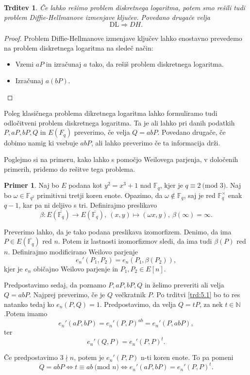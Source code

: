 \documentclass[12pt,a4paper,twoside]{article}
\theoremstyle{definition} %
\newtheorem{primer}[definicija]{Primer}
\theoremstyle{plain} %
\newtheorem{trditev}[definicija]{Trditev}
\numberwithin{equation}{section}  %
\newcommand{\N}{\mathbb N}
\newcommand{\F}{\mathbb F}
\newcommand{\E}[1]{E({#1})}
\newcommand{\MOD}[1]{\ \text{(mod }{#1}\text{)}}
\begin{document}
\begin{trditev}
Če lahko rešimo problem diskretnega logaritma, potem smo rešili tudi problem Diffie-Hellmanove izmenjave ključev. Povedano drugače velja
$$\text{DL} \Rightarrow DH.$$
\end{trditev}

\begin{proof}
Problem Diffie-Hellmanove izmenjave ključev lahko enostavno prevedemo na problem diskretnega logaritma na sledeč način:

\begin{itemize}
\item Vzemi $aP$ in izračunaj $a$ tako, da rešiš problem diskretnega logaritma.
\item Izračunaj $a(bP)$.
\end{itemize}

\end{proof}

Poleg klasičnega problema dikretnega logaritma lahko formuliramo tudi odločitveni problem diskretnega logaritma. Ta je ali lahko pri danih podatkih $P,aP,bP,Q$ in $\E{F_q}$ preverimo, če velja $Q = abP$.
Povedano drugače, če dobimo namig ki vsebuje $abP$, ali lahko preverimo če ta informacija drži.

Poglejmo si na primeru, kako lahko s pomočjo Weilovega parjenja, v določenih primerih, pridemo do rešitve tega problema.

\begin{primer}
Naj bo $E$ podana kot $y^2=x^3+1$ nad $\F_q$, kjer je $q \equiv 2 \MOD{3}$. Naj bo $\omega \in \F_{q^2}$ primitivni tretji koren enote. Opazimo, da $\omega \notin \F_q$, saj je red $\F^{\times}_q$ enak $q-1$, kar pa ni deljivo s tri.
Definirajmo preslikavo
$$\beta:\E{\overline{\F_q}} \rightarrow \E{\overline{\F_q}}, \ (x,y) \mapsto (\omega x,y), \ \beta(\infty) = \infty.$$

Preverimo lahko, da je tako podana preslikava izomorfizem. Denimo, da ima $P \in \E{\overline{\F_q}}$ red $n$. Potem iz lastnosti izomorfizmov sledi, da ima tudi $\beta(P)$ red $n$.
Definirajmo modificirano Weilovo parjenje
$$e_n'(P_1,P_2) = e_n(P_1,\beta(P_2)),$$
kjer je $e_n$ običajno Weilovo parjenje in $P_1,P_2 \in E[n]$.

Predpostavimo sedaj, da poznamo $P,aP,bP,Q$ in želimo preveriti ali velja $Q=abP$. Najprej preverimo, če je $Q$ večkratnik $P$. Po trditvi \ref{trd:5.1} bo to res natanko tedaj ko $e_n(P,Q) = 1$.
Predpostavimo, da velja $Q = tP$, za nek $t \in \N$.Potem imamo
$$e_n'(aP,bP)=e_n'(P,P)^{ab} = e_n'(P,abP),$$
ter
$$e_n'(Q,P) = e_n'(P,P)^t.$$

Če predpostavimo $3 \nmid n$, potem je $e_n'(P,P)$ n-ti koren enote. To pa pomeni
$$Q=abP \iff t \equiv ab \MOD{n} \iff e_n'(aP,bP)=e_n'(P,P)^t.$$
\end{primer}
\end{document}
